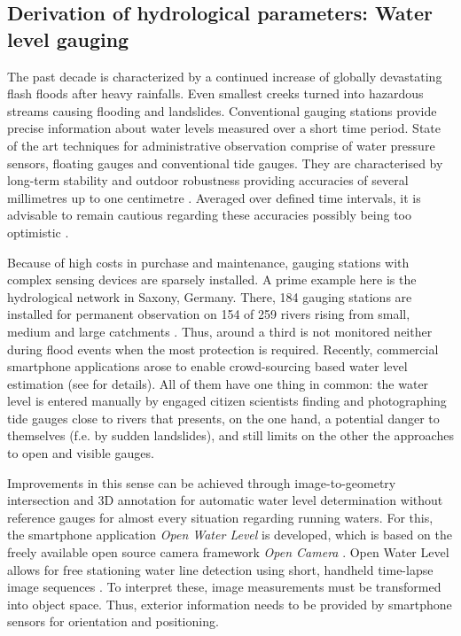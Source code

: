 \documentclass[review]{elsarticle}
\begin{document}
\subsection{Derivation of hydrological parameters: Water level gauging}
\label{sec:water_level_gauging_intro}
The past decade is characterized by a continued increase of globally devastating flash floods after heavy rainfalls. Even smallest creeks turned into hazardous streams causing flooding and landslides. Conventional gauging stations provide precise information about water levels measured over a short time period. State of the art techniques for administrative observation comprise of water pressure sensors, floating gauges and conventional tide gauges. They are characterised by long-term stability and outdoor robustness providing accuracies of several millimetres up to one centimetre \cite{Siedschlag2015}. Averaged over defined time intervals, it is advisable to remain cautious regarding these accuracies possibly being too optimistic \cite{Horner2018} . 
 
Because of high costs in purchase and maintenance, gauging stations with complex sensing devices are sparsely installed. A prime example here is the hydrological network in Saxony, Germany. There, 184 gauging stations are installed for permanent observation on 154 of 259 rivers rising from small, medium and large catchments \cite{Saxon2018, Buettner2015}. Thus, around a third is not monitored neither during flood events when the most protection is required. Recently, commercial smartphone applications arose to enable crowd-sourcing based water level estimation (see \cite{CrowdWaterApp2017a,Kisters2014} for details). All of them have one thing in common: the water level is entered manually by engaged citizen scientists finding and photographing tide gauges close to rivers that presents, on the one hand, a potential danger to themselves (f.e. by sudden landslides), and still limits on the other the approaches to open and visible gauges.

Improvements in this sense can be achieved through image-to-geometry intersection and 3D annotation for automatic water level determination without reference gauges for almost every situation regarding running waters. 
For this, the smartphone application \textit{Open Water Level} is developed, which is based on the freely available open source camera framework \textit{Open Camera} \cite{Harman2017}. Open Water Level allows for free stationing water line detection using short, handheld time-lapse image sequences \cite{Kroehnert2017a}. To interpret these, image measurements must be transformed into object space. Thus, exterior information needs to be provided by smartphone sensors for orientation and positioning.
\end{document}

